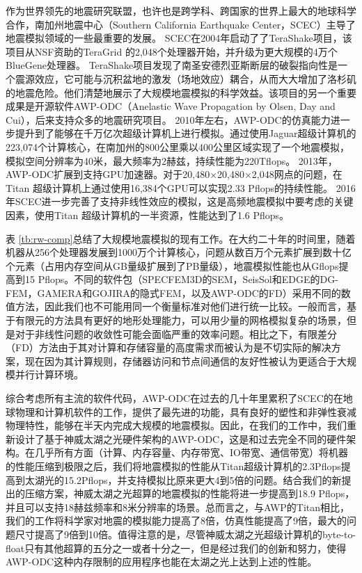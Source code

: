 \documentclass[degree=doctor]{thuthesis}
\begin{document}
作为世界领先的地震研究联盟，也许也是跨学科、跨国家的世界上最大的地球科学合作，南加州地震中心（Southern California Earthquake Center，SCEC）主导了地震模拟领域的一些最重要的发展。 SCEC在2004年启动了了TeraShake项目，该项目从NSF资助的TeraGrid \citep{teragrid}的2,048个处理器开始，并升级为更大规模的4万个BlueGene处理器。 TeraShake项目发现了南圣安德烈亚斯断层的破裂指向性是一个震源效应，它可能与沉积盆地的激发（场地效应）耦合，从而大大增加了洛杉矶的地震危险。他们清楚地展示了大规模地震模拟的科学效益。该项目的另一个重要成果是开源软件AWP-ODC（Anelastic Wave Propagation by Olsen, Day and Cui），后来支持众多的地震研究项目。 2010年左右，AWP-ODC的仿真能力进一步提升到了能够在千万亿次超级计算机上进行模拟\citep{cui2010scalable}。通过使用Jaguar超级计算机的223,074个计算核心，在南加州的800公里乘以400公里区域实现了一个地震模拟，模拟空间分辨率为40米，最大频率为2赫兹，持续性能为220Tflops。 2013年，AWP-ODC扩展到支持GPU加速器。对于20,480×20,480×2,048网点的问题，在Titan \citep {cui2013physics}超级计算机上通过使用16,384个GPU可以实现2.33 Pflops的持续性能。 2016年SCEC进一步完善了支持非线性效应的模拟，这是高频地震模拟中要考虑的关键因素，使用Titan \citep {roten2016high}超级计算机的一半资源，性能达到了1.6 Pflops。

表 \ref{tb:rw-comp}总结了大规模地震模拟的现有工作。在大约二十年的时间里，随着机器从256个处理器发展到1000万个计算核心，问题从数百万个元素扩展到数十亿个元素（占用内存空间从GB量级扩展到了PB量级），地震模拟性能也从Gflops提高到15 Pflops。不同的软件包（SPECFEM3D的SEM，SeisSol和EDGE的DG-FEM，GAMERA和GOJIRA的隐式FEM，以及AWP-ODC的FD）采用不同的数值方法，因此我们也不可能用同一个衡量标准对他们进行统一比较。一般而言，基于有限元的方法具有更好的地形处理能力，可以用少量的网格模拟复杂的场景，但是对于非线性问题的收敛性可能会面临严重的效率问题。相比之下，有限差分（FD）方法由于其对计算和存储容量的高度需求而被认为是不切实际的解决方案，现在因为其计算规则，存储器访问和节点间通信的友好性被认为更适合于大规模并行计算环境。

综合考虑所有主流的软件代码，AWP-ODC在过去的几十年里累积了SCEC的在地球物理和计算机软件的工作，提供了最先进的功能，具有良好的塑性和非弹性衰减物理特性，能够在半天内完成大规模的地震模拟。因此，在我们的工作中，我们重新设计了基于神威太湖之光硬件架构的AWP-ODC，这是和过去完全不同的硬件架构。在几乎所有方面（计算、内存容量、内存带宽、IO带宽、通信带宽）将机器的性能压缩到极限之后，我们将地震模拟的性能从Titan超级计算机的2.3Pflops提高到太湖光的15.2Pflops，并支持模拟比原来更大4到5倍的问题。结合我们的新提出的压缩方案，神威太湖之光超算的地震模拟的性能将进一步提高到18.9 Pflops，并且可以支持18赫兹频率和8米分辨率的场景。总而言之，与AWP的Titan相比，我们的工作将科学家对地震的模拟能力提高了8倍，仿真性能提高了9倍，最大的问题尺寸提高了9倍到10倍。值得注意的是，尽管神威太湖之光超级计算机的byte-to-float只有其他超算的五分之一或者十分之一，但是经过我们的创新和努力，使得AWP-ODC这种内存限制的应用程序也能在太湖之光上达到上述的性能。
\end{document}
